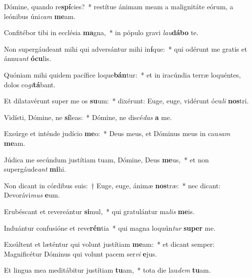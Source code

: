 \item Dómine, quando re\textbf{spí}cies?~* restítue ánimam meam a malignitáte eórum, a leónibus úni\textit{cam} \textbf{me}am.
\item Confitébor tibi in ecclésia \textbf{ma}gna,~* in pópulo gravi \textit{lau}\textbf{dá}\textbf{bo} te.
\item Non supergáudeant mihi qui adversántur mihi in\textbf{í}que:~* qui odérunt me gratis et ánnu\textit{unt} \textbf{ó}\textbf{cu}lis.
\item Quóniam mihi quidem pacífice loque\textbf{bán}tur:~* et in iracúndia terræ loquéntes, dolos co\textit{gi}\textbf{tá}bant.
\item Et dilatavérunt super me os \textbf{su}um:~* dixérunt: Euge, euge, vidérunt ócu\textit{li} \textbf{nos}tri.
\item Vidísti, Dómine, ne \textbf{sí}leas:~* Dómine, ne discé\textit{das} \textbf{a} me.
\item Exsúrge et inténde judício \textbf{me}o:~* Deus meus, et Dóminus meus in cau\textit{sam} \textbf{me}am.
\item Júdica me secúndum justítiam tuam, Dómine, Deus \textbf{me}us,~* et non supergáude\textit{ant} \textbf{mi}hi.
\item Non dicant in córdibus suis:~† Euge, euge, ánimæ \textbf{nos}træ:~* nec dicant: Devorávi\textit{mus} \textbf{e}um.
\item Erubéscant et revereántur \textbf{si}mul,~* qui gratulántur ma\textit{lis} \textbf{me}is.
\item Induántur confusióne et reve\textbf{rén}tia~* qui magna loquún\textit{tur} \textbf{su}\textbf{per} me.
\item Exsúltent et læténtur qui volunt justítiam \textbf{me}am:~* et dicant semper: Magnificétur Dóminus qui volunt pacem ser\textit{vi} \textbf{e}jus.
\item Et lingua mea meditábitur justítiam \textbf{tu}am,~* tota die lau\textit{dem} \textbf{tu}am.
